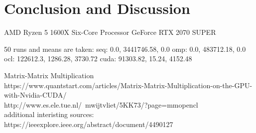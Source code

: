 \documentclass[a4paper,12pt]{llncs}
\numberwithin{equation}{section}
\begin{document}

\section{Conclusion and Discussion}


AMD Ryzen 5 1600X Six-Core Processor
GeForce RTX 2070 SUPER

50 runs and means are taken:
seq: 0.0, 3441746.58, 0.0
omp: 0.0, 483712.18, 0.0
ocl: 122612.3, 1286.28, 3730.72
cuda: 91303.82, 15.24, 4152.48


Matrix-Matrix Multiplication\\
https://www.quantstart.com/articles/Matrix-Matrix-Multiplication-on-the-GPU-with-Nvidia-CUDA/\\
http://www.es.ele.tue.nl/~mwijtvliet/5KK73/?page=mmopencl\\

additional interisting sources:\\
  https://ieeexplore.ieee.org/abstract/document/4490127




\newpage



\end{document}
